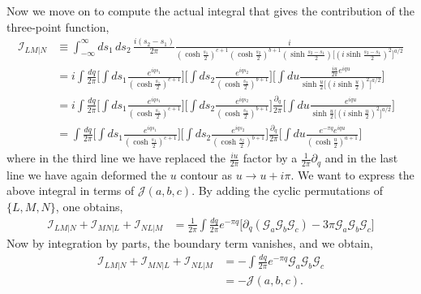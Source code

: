 \documentclass[11pt]{article}
\newcommand{\p}{\partial}
\newcommand{\lb}{\left(}
\newcommand{\rb}{\right)}
\begin{document}
Now we move on to compute the actual integral that gives the contribution of the three-point function,
\begin{align}
    \mathcal{I}_{LM|N}&\equiv\int_{-\infty}^\infty ds_1 \, ds_2 \, \frac{i(s_2 - s_1)}{2\pi} \frac{i}{\lb\cosh\frac{s_1}{2}\rb^{c+1}\lb\cosh\frac{s_2}{2}\rb^{b+1}\lb\sinh\frac{s_2-s_1}{2}\rb\Big[\lb i\sinh\frac{s_2 - s_1}{2}\rb^2\Big]^{a/2}} \\
    &= i\int \frac{dq}{2\pi} \Bigg[\int ds_1 \frac{e^{iqs_1}}{\lb\cosh\frac{s_1}{2}\rb^{c+1}}  \Bigg]\Bigg[\int ds_2 \frac{e^{iqs_2}}{\lb\cosh\frac{s_2}{2}\rb^{b+1}}  \Bigg] \Bigg[\int du \frac{\frac{iu}{2\pi}e^{iqu}}{\sinh\frac{u}{2}\Big[\lb i \sinh\frac{u}{2}\rb^{2}\Big]^{a/2}}\Bigg] \\
    &= i\int\frac{dq}{2\pi} \Bigg[\int ds_1 \frac{e^{iqs_1}}{\lb\cosh\frac{s_1}{2}\rb^{c+1}}  \Bigg]\Bigg[\int ds_2 \frac{e^{iqs_2}}{\lb\cosh\frac{s_2}{2}\rb^{b+1}}  \Bigg] \frac{\p_q}{2\pi}\Bigg[\int du \frac{e^{iqu}}{\sinh\frac{u}{2}\Big[\lb i \sinh\frac{u}{2}\rb^{2}\Big]^{a/2}}\Bigg] \\
    &= \int \frac{dq}{2\pi} \Bigg[\int ds_1 \frac{e^{iqs_1}}{\lb\cosh\frac{s_1}{2}\rb^{c+1}}  \Bigg]\Bigg[\int ds_2 \frac{e^{iqs_2}}{\lb\cosh\frac{s_2}{2}\rb^{b+1}}  \Bigg] \frac{\p_q}{2\pi}\Bigg[\int du \frac{e^{-\pi q}e^{iqu}}{\lb\cosh\frac{u}{2}\rb^{a+1}}\Bigg]
\end{align}
where in the third line we have replaced the $\frac{iu}{2\pi}$ factor by a $\frac{1}{2\pi}\p_q$ and in the last line we have again deformed the $u$ contour as $u \to u + i\pi$. We want to express the above integral in terms of $\mathcal{J}(a,b,c)$. 
By adding the cyclic permutations of $\{L,M,N\}$, one obtains,
\begin{align}
    \mathcal{I}_{LM|N} + \mathcal{I}_{MN|L} + \mathcal{I}_{NL|M} &= \frac{1}{2\pi} \int \frac{dq}{2\pi}e^{-\pi q}\Bigg[\p_q \lb \mathcal{G}_a\mathcal{G}_b\mathcal{G}_c\rb -3\pi\mathcal{G}_a\mathcal{G}_b\mathcal{G}_c \Bigg]
\end{align}
Now by integration by parts, the boundary term vanishes, and we obtain,
\begin{align}
    \mathcal{I}_{LM|N} + \mathcal{I}_{MN|L} + \mathcal{I}_{NL|M} &= -\int \frac{dq}{2\pi}e^{-\pi q}\mathcal{G}_a\mathcal{G}_b\mathcal{G}_c \\
    &= -\mathcal{J}(a,b,c).
\end{align}
\end{document}
